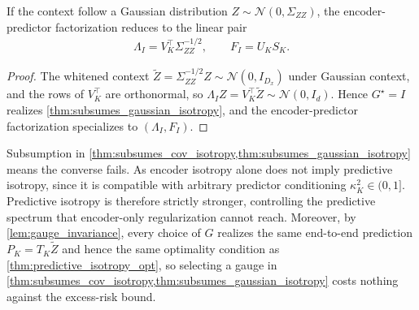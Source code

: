 \begin{corollary}
\label{cor:linear_gauss}
If the context follow a Gaussian distribution $Z \sim \mathcal{N}(0, \Sigma_{ZZ})$, the encoder-predictor factorization reduces to the linear pair
\begin{align*}
\Lambda_I = V_K^\top \Sigma_{ZZ}^{-1/2}, \qquad F_I = U_K S_K.
\end{align*}
\end{corollary}
\begin{proof}
The whitened context $\widetilde Z = \Sigma_{ZZ}^{-1/2} Z \sim \mathcal{N}(0, I_{D_x})$ under Gaussian context, and the rows of $V_K^\top$ are orthonormal, so $\Lambda_I Z = V_K^\top \widetilde Z \sim \mathcal{N}(0, I_d)$. Hence $G^\star = I$ realizes \cref{thm:subsumes_gaussian_isotropy}, and the encoder-predictor factorization specializes to $(\Lambda_I, F_I)$.
\end{proof}


Subsumption in \cref{thm:subsumes_cov_isotropy,thm:subsumes_gaussian_isotropy} means the converse fails. 
As encoder isotropy alone does not imply predictive isotropy, since it is compatible with arbitrary predictor conditioning $\kappa^2_K \in (0,1]$.
Predictive isotropy is therefore strictly stronger, controlling the predictive spectrum that encoder-only regularization cannot reach.
Moreover, by \cref{lem:gauge_invariance}, every choice of $G$ realizes the same end-to-end prediction $P_K = T_K \widetilde{Z}$ and hence the same optimality condition as \cref{thm:predictive_isotropy_opt}, so selecting a gauge in \cref{thm:subsumes_cov_isotropy,thm:subsumes_gaussian_isotropy} costs nothing against the excess-risk bound.








